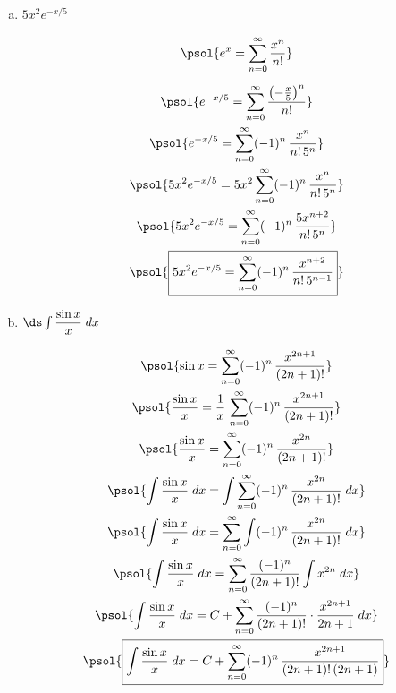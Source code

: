 \documentclass[12pt,letterpaper]{exam}
\begin{document}
\begin{questions}
\begin{enumerate}[(a)]
	\newpage
	
	\item $5x^2 e^{-x/5}$ \par\vspace{0.1cm}
		\[
		\begin{gathered}
		\psol{e^x= \sum_{n=0}^\infty \dfrac{x^n}{n!}} \\[0.2cm]
		\psol{e^{-x/5}= \sum_{n=0}^\infty \dfrac{\left(-\tfrac{x}{5} \right)^n}{n!}} \\
		\psol{e^{-x/5}= \sum_{n=0}^\infty (-1)^n\, \dfrac{x^n}{n! \, 5^n}} \\
		\psol{5x^2 e^{-x/5}= 5x^2 \sum_{n=0}^\infty (-1)^n\, \dfrac{x^n}{n! \, 5^n}} \\
		\psol{5x^2 e^{-x/5}= \sum_{n=0}^\infty (-1)^n\, \dfrac{5x^{n+2}}{n! \, 5^n}} \\
		\psol{\boxed{5x^2 e^{-x/5}= \sum_{n=0}^\infty (-1)^n\, \dfrac{x^{n+2}}{n! \, 5^{n-1}}}} 
		\end{gathered}
		\] \par\vspace{0.3cm}
	
	\item $\ds\int \dfrac{\sin x}{x} \;dx$ \par\vspace{0.1cm}
		\[
		\begin{gathered}
		\psol{\sin x= \sum_{n=0}^\infty (-1)^n\, \dfrac{x^{2n+1}}{(2n + 1)!}} \\
		\psol{\dfrac{\sin x}{x}= \dfrac{1}{x} \,\sum_{n=0}^\infty (-1)^n\, \dfrac{x^{2n+1}}{(2n + 1)!}} \\
		\psol{\dfrac{\sin x}{x}= \sum_{n=0}^\infty (-1)^n\, \dfrac{x^{2n}}{(2n + 1)!}} \\
		\psol{\int \dfrac{\sin x}{x} \;dx= \int \sum_{n=0}^\infty (-1)^n\, \dfrac{x^{2n}}{(2n + 1)!} \;dx} \\
		\psol{\int \dfrac{\sin x}{x} \;dx= \sum_{n=0}^\infty \int (-1)^n\, \dfrac{x^{2n}}{(2n + 1)!} \;dx} \\
		\psol{\int \dfrac{\sin x}{x} \;dx= \sum_{n=0}^\infty \dfrac{(-1)^n}{(2n + 1)!} \int x^{2n} \;dx} \\
		\psol{\int \dfrac{\sin x}{x} \;dx= C + \sum_{n=0}^\infty \dfrac{(-1)^n}{(2n + 1)!} \cdot \dfrac{x^{2n+1}}{2n + 1} \;dx} \\
		\psol{\boxed{\int \dfrac{\sin x}{x} \;dx= C + \sum_{n=0}^\infty (-1)^n\, \dfrac{x^{2n + 1}}{(2n + 1)! \, (2n+1)}}}
		\end{gathered}
		\]
	\end{enumerate}




\end{questions}
\end{document}
